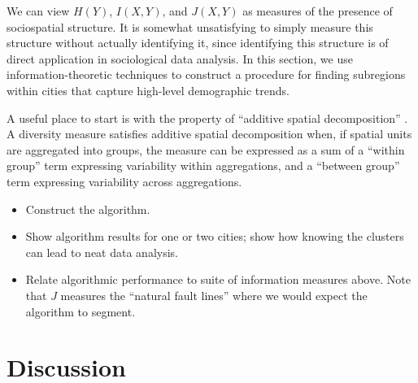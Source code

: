 \documentclass[english]{scrartcl}
\begin{document}
	We can view $H(Y)$, $I(X,Y)$, and $J(X,Y)$ as measures of the presence of sociospatial structure. It is somewhat unsatisfying to simply measure this structure without actually identifying it, since identifying this structure is of direct application in sociological data analysis. In this section, we use information-theoretic techniques to construct a procedure for finding subregions within cities that capture high-level demographic trends. 

	A useful place to start is with the property of ``additive spatial decomposition'' \cite{Reardon2004}. A diversity measure satisfies additive spatial decomposition when, if spatial units are aggregated into groups, the measure can be expressed as a sum of a ``within group'' term expressing variability within aggregations, and a ``between group'' term expressing variability across aggregations. 


	\begin{itemize}
		\item Construct the algorithm. 
		\item Show algorithm results for one or two cities; show how knowing the clusters can lead to neat data analysis. 
		\item Relate algorithmic performance to suite of information measures above. Note that $J$ measures the ``natural fault lines'' where we would expect the algorithm to segment.  
	\end{itemize}

\section{Discussion} \label{sec:discussion}

{}




\end{document}
